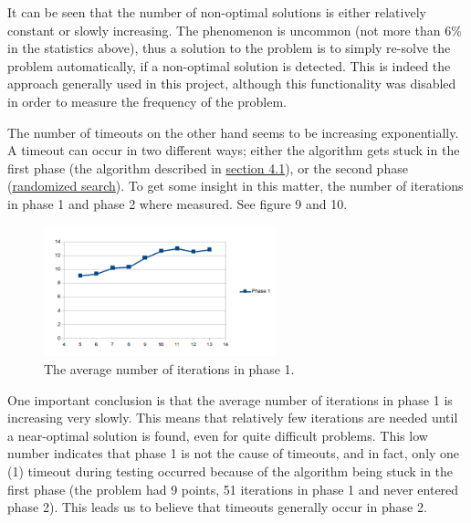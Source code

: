 \documentclass[a4paper,12pt]{article}
\begin{document}
It can be seen that the number of non-optimal solutions is either relatively constant or slowly increasing. The phenomenon is uncommon (not more than 6\% in the statistics above), thus a solution to the problem is to simply re-solve the problem automatically, if a non-optimal solution is detected. This is indeed the approach generally used in this project, although this functionality was disabled in order to measure the frequency of the problem.

The number of timeouts on the other hand seems to be increasing exponentially. A timeout can occur in two different ways; either the algorithm gets stuck in the first phase (the algorithm described in \hyperref[ref:Algorithm]{section 4.1}), or the second phase (\hyperref[sec:rand]{randomized search}). To get some insight in this matter, the number of iterations in phase 1 and phase 2 where measured. See figure 9 and 10.


\begin{figure}[!ht]
\begin{center}
\includegraphics[width=0.6\textwidth]{pictures/phase1iterations.png}
 \caption[Close up of \textit{Hemidactylus} sp.]
   {The average number of iterations in phase 1.}
\end{center}
\end{figure}

One important conclusion is that the average number of iterations in phase 1 is increasing very slowly. This means that relatively few iterations are needed until a near-optimal solution is found, even for quite difficult problems. This low number indicates that phase 1 is not the cause of timeouts, and in fact, only one (1) timeout during testing occurred because of the algorithm being stuck in the first phase (the problem had 9 points, 51 iterations in phase 1 and never entered phase 2). This leads us to believe that timeouts generally occur in phase 2.
\end{document}
